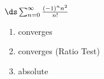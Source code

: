 {$\ds \sum_{n=0}^\infty \frac{(-1)^nn^2}{n!}$
}
{\begin{enumerate}
	\item converges
	\item	converges (Ratio Test)
	\item absolute
\end{enumerate}
}